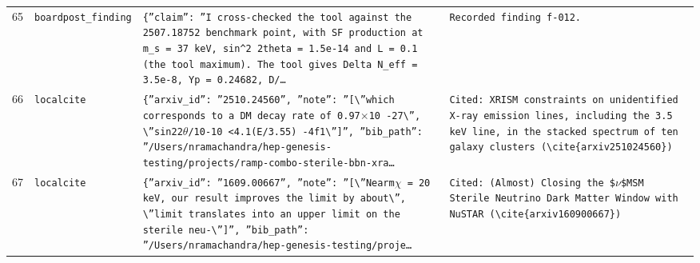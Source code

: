 \documentclass[11pt,a4paper]{article}
\begin{document}
\begin{longtable}{@{}p{}p{}p{}p{}@{}}
65 & \texttt{board}\newline\texttt{post\_\allowbreak{}finding} & \texttt{\{''claim'':\allowbreak{} ''I cross-checked the tool against the 2507.18752 benchmark point,\allowbreak{} with SF production at m\_\allowbreak{}s =\allowbreak{} 37 keV,\allowbreak{} sin\textasciicircum{}\allowbreak{}2 2theta =\allowbreak{} 1.5e-14 and L =\allowbreak{} 0.1 (the tool maximum)\allowbreak{}. The tool gives Delta N\_\allowbreak{}eff =\allowbreak{} 3.5e-8,\allowbreak{} Yp =\allowbreak{} 0.24682,\allowbreak{} D/\allowbreak{}\ldots{}\allowbreak{}} & \texttt{Recorded finding f-012.} \\
66 & \texttt{local}\newline\texttt{cite} & \texttt{\{''arxiv\_\allowbreak{}id'':\allowbreak{} ''2510.24560'',\allowbreak{} ''note'':\allowbreak{} ''[\textbackslash{}\allowbreak{}''which corresponds to a DM decay rate of 0.97$\times$10 -27\textbackslash{}\allowbreak{}'',\allowbreak{} \textbackslash{}\allowbreak{}''sin22$\theta$/\allowbreak{}10-10 \textless{}\allowbreak{}4.1(E/\allowbreak{}3.55)\allowbreak{} -4f1\textbackslash{}\allowbreak{}'']\allowbreak{}'',\allowbreak{} ''bib\_\allowbreak{}path'':\allowbreak{} ''/\allowbreak{}Users/\allowbreak{}nramachandra/\allowbreak{}hep-genesis-testing/\allowbreak{}projects/\allowbreak{}ramp-combo-sterile-bbn-xra\ldots{}\allowbreak{}} & \texttt{Cited:\allowbreak{} XRISM constraints on unidentified X-ray emission lines,\allowbreak{} including the 3.5 keV line,\allowbreak{} in the stacked spectrum of ten galaxy clusters (\textbackslash{}\allowbreak{}cite\{arxiv251024560\}\allowbreak{})\allowbreak{}} \\
67 & \texttt{local}\newline\texttt{cite} & \texttt{\{''arxiv\_\allowbreak{}id'':\allowbreak{} ''1609.00667'',\allowbreak{} ''note'':\allowbreak{} ''[\textbackslash{}\allowbreak{}''Nearm$\chi$ =\allowbreak{} 20 keV,\allowbreak{} our result improves the limit by about\textbackslash{}\allowbreak{}'',\allowbreak{} \textbackslash{}\allowbreak{}''limit translates into an upper limit on the sterile neu-\textbackslash{}\allowbreak{}'']\allowbreak{}'',\allowbreak{} ''bib\_\allowbreak{}path'':\allowbreak{} ''/\allowbreak{}Users/\allowbreak{}nramachandra/\allowbreak{}hep-genesis-testing/\allowbreak{}proje\ldots{}\allowbreak{}} & \texttt{Cited:\allowbreak{} (Almost)\allowbreak{} Closing the \$$\nu$\$MSM Sterile Neutrino Dark Matter Window with NuSTAR (\textbackslash{}\allowbreak{}cite\{arxiv160900667\}\allowbreak{})\allowbreak{}} \\

\end{longtable}
\end{document}
